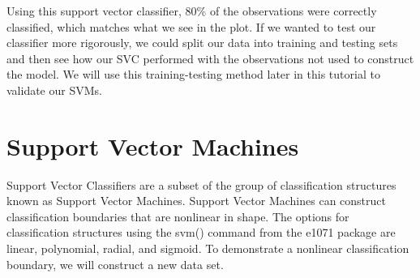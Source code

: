 \documentclass[]{book}
\newenvironment{Shaded}{\begin{snugshade}}{\end{snugshade}}
\newcommand{\CommentTok}[1]{\textcolor[rgb]{0.56,0.35,0.01}{\textit{#1}}}
\newcommand{\DataTypeTok}[1]{\textcolor[rgb]{0.13,0.29,0.53}{#1}}
\newcommand{\DecValTok}[1]{\textcolor[rgb]{0.00,0.00,0.81}{#1}}
\newcommand{\FloatTok}[1]{\textcolor[rgb]{0.00,0.00,0.81}{#1}}
\newcommand{\KeywordTok}[1]{\textcolor[rgb]{0.13,0.29,0.53}{\textbf{#1}}}
\newcommand{\NormalTok}[1]{#1}
\newcommand{\OperatorTok}[1]{\textcolor[rgb]{0.81,0.36,0.00}{\textbf{#1}}}
\newcommand{\StringTok}[1]{\textcolor[rgb]{0.31,0.60,0.02}{#1}}
\begin{document}
Using this support vector classifier, 80\% of the observations were correctly classified, which matches what we see in the plot. If we wanted to test our classifier more rigorously, we could split our data into training and testing sets and then see how our SVC performed with the observations not used to construct the model. We will use this training-testing method later in this tutorial to validate our SVMs.

\hypertarget{support-vector-machines}{%
\section{Support Vector Machines}\label{support-vector-machines}}

Support Vector Classifiers are a subset of the group of classification structures known as Support Vector Machines. Support Vector Machines can construct classification boundaries that are nonlinear in shape. The options for classification structures using the svm() command from the e1071 package are linear, polynomial, radial, and sigmoid. To demonstrate a nonlinear classification boundary, we will construct a new data set.

\begin{Shaded}
\end{Shaded}
\end{document}
